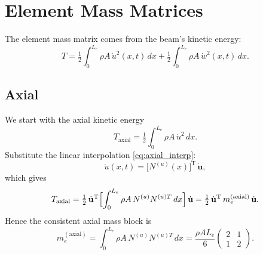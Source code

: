 \documentclass{article}
\begin{document}
	\section{Element Mass Matrices}
	The element mass matrix comes from the beam’s kinetic energy:
	\begin{equation}
		T
		= \tfrac12\int_0^{L_e}\rho A\,\dot u^2(x,t)\,dx
		+\tfrac12\int_0^{L_e}\rho A\,\dot w^2(x,t)\,dx.
	\end{equation}
	
	\subsection{Axial}
	We start with the axial kinetic energy
	\begin{equation}
		T_{\mathrm{axial}}
		= \tfrac12\int_0^{L_e}\rho A\,\dot u^2\,dx.
	\end{equation}
	Substitute the linear interpolation \eqref{eq:axial_interp}:
	\begin{equation}
		\dot u(x,t)
		= \bigl[N^{(u)}(x)\bigr]^\text{T}\,\dot{\mathbf{u}},
	\end{equation}
	which gives
	\begin{equation}
		T_{\mathrm{axial}}
		= \tfrac12\,\dot{\mathbf{u}}^\text{T}
		\Bigl[\int_0^{L_e}\rho A\,N^{(u)}N^{(u)T}\,dx\Bigr]
		\,\dot{\mathbf{u}}
		= \tfrac12\,\dot{\mathbf{u}}^\text{T}\,m_e^{(\mathrm{axial})}\,\dot{\mathbf{u}}.
	\end{equation}
	Hence the consistent axial mass block is
	\begin{equation}\label{eq:me_axial}
		m_e^{(\mathrm{axial})}
		= \int_0^{L_e}\rho A\,N^{(u)}N^{(u)T}\,dx
		= \frac{\rho A L_e}{6}
		\begin{pmatrix}2 & 1\\ 1 & 2\end{pmatrix}.
	\end{equation}
	
\end{document}
